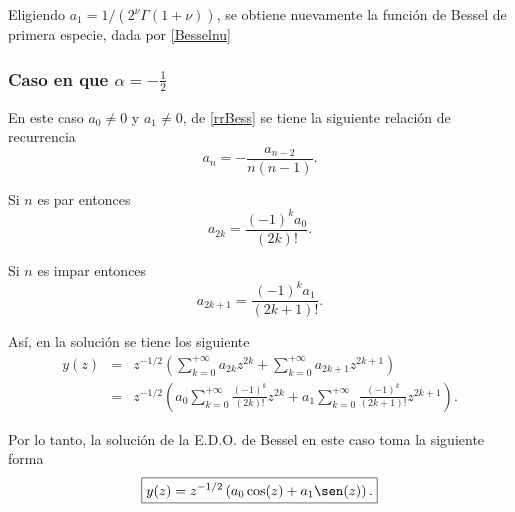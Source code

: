Eligiendo $a_1=1/(2^{\nu}\Gamma(1+\nu))$, se obtiene nuevamente la funci\'on de Bessel de primera especie, dada por \eqref{Besselnu}

\subsubsection{Caso en que $\alpha=-\frac{1}{2}$}

En este caso $a_0\neq 0$ y $a_1\neq 0$, de \eqref{rrBess} se tiene la siguiente relaci\'on de recurrencia
\begin{equation}
a_n=-\frac{a_{n-2}}{n(n-1)}.
\end{equation} 

Si $n$ es par entonces
\begin{equation}
a_{2k}=\frac{(-1)^k a_0}{(2k)!}.
\end{equation}

Si $n$ es impar entonces
\begin{equation}
a_{2k+1}=\frac{(-1)^k a_1}{(2k+1)!}.
\end{equation}

As\'i, en la soluci\'on se tiene los siguiente
\begin{eqnarray}
y(z)&=&z^{-1/2}\left(\sum_{k=0}^{+\infty}a_{2k}z^{2k}+\sum_{k=0}^{+\infty}a_{2k+1}z^{2k+1} \right)\\
&=&z^{-1/2}\left(a_0\sum_{k=0}^{+\infty}\frac{(-1)^k}{(2k)!}z^{2k}+a_1\sum_{k=0}^{+\infty}\frac{(-1)^k}{(2k+1)!}z^{2k+1} \right).
\end{eqnarray}

Por lo tanto, la soluci\'on de la E.D.O. de Bessel en este caso toma la siguiente forma
\begin{equation}
\boxed{y(z)= z^{-1/2}\left(a_0\cos(z)+a_1\sen(z) \right).}
\end{equation}



